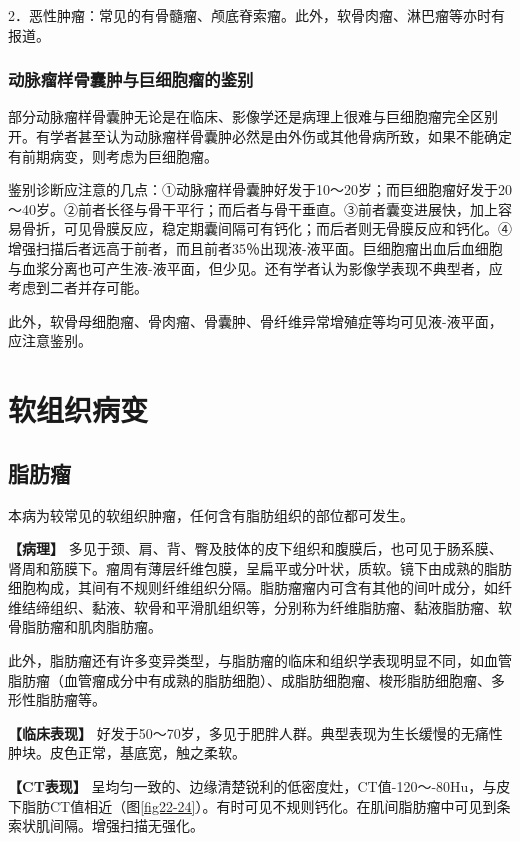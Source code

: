 2．恶性肿瘤：常见的有骨髓瘤、颅底脊索瘤。此外，软骨肉瘤、淋巴瘤等亦时有报道。

\subsubsection{动脉瘤样骨囊肿与巨细胞瘤的鉴别}

部分动脉瘤样骨囊肿无论是在临床、影像学还是病理上很难与巨细胞瘤完全区别开。有学者甚至认为动脉瘤样骨囊肿必然是由外伤或其他骨病所致，如果不能确定有前期病变，则考虑为巨细胞瘤。

鉴别诊断应注意的几点：①动脉瘤样骨囊肿好发于10～20岁；而巨细胞瘤好发于20～40岁。②前者长径与骨干平行；而后者与骨干垂直。③前者囊变进展快，加上容易骨折，可见骨膜反应，稳定期囊间隔可有钙化；而后者则无骨膜反应和钙化。④增强扫描后者远高于前者，而且前者35％出现液-液平面。巨细胞瘤出血后血细胞与血浆分离也可产生液-液平面，但少见。还有学者认为影像学表现不典型者，应考虑到二者并存可能。

此外，软骨母细胞瘤、骨肉瘤、骨囊肿、骨纤维异常增殖症等均可见液-液平面，应注意鉴别。

\section{软组织病变}

\subsection{脂肪瘤}

本病为较常见的软组织肿瘤，任何含有脂肪组织的部位都可发生。

\textbf{【病理】}
多见于颈、肩、背、臀及肢体的皮下组织和腹膜后，也可见于肠系膜、肾周和筋膜下。瘤周有薄层纤维包膜，呈扁平或分叶状，质软。镜下由成熟的脂肪细胞构成，其间有不规则纤维组织分隔。脂肪瘤瘤内可含有其他的间叶成分，如纤维结缔组织、黏液、软骨和平滑肌组织等，分别称为纤维脂肪瘤、黏液脂肪瘤、软骨脂肪瘤和肌肉脂肪瘤。

此外，脂肪瘤还有许多变异类型，与脂肪瘤的临床和组织学表现明显不同，如血管脂肪瘤（血管瘤成分中有成熟的脂肪细胞）、成脂肪细胞瘤、梭形脂肪细胞瘤、多形性脂肪瘤等。

\textbf{【临床表现】}
好发于50～70岁，多见于肥胖人群。典型表现为生长缓慢的无痛性肿块。皮色正常，基底宽，触之柔软。

\textbf{【CT表现】}
呈均匀一致的、边缘清楚锐利的低密度灶，CT值-120～-80Hu，与皮下脂肪CT值相近（图\ref{fig22-24}）。有时可见不规则钙化。在肌间脂肪瘤中可见到条索状肌间隔。增强扫描无强化。

